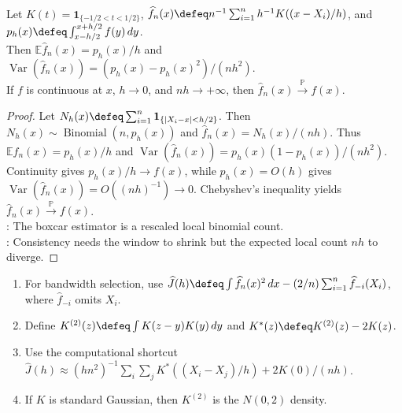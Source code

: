 \begin{proposition} \label{prop:boxcar-kernel-expectation-variance-consistency} \\
Let $K(t)=\mathbf{1}_{\{-1/2<t<1/2\}}$, $\widehat f_n(x)\defeq n^{-1}\sum_{i=1}^{n}h^{-1}K((x-X_i)/h)$, and $p_h(x)\defeq\int_{x-h/2}^{x+h/2}f(y)\,dy$.\\
Then $\mathbb{E}\widehat f_n(x)=p_h(x)/h$ and $\operatorname{Var}(\widehat f_n(x))=(p_h(x)-p_h(x)^2)/(nh^2)$.\\
If $f$ is continuous at $x$, $h\to0$, and $nh\to+\infty$, then $\widehat f_n(x)\xrightarrow{\mathbb{P}}f(x)$.
\begin{proof}
Let $N_h(x)\defeq\sum_{i=1}^{n}\mathbf{1}_{\{|X_i-x|<h/2\}}$.
Then $N_h(x)\sim\operatorname{Binomial}(n,p_h(x))$ and $\widehat f_n(x)=N_h(x)/(nh)$.
Thus $\mathbb{E}\widehat f_n(x)=p_h(x)/h$ and $\operatorname{Var}(\widehat f_n(x))=p_h(x)(1-p_h(x))/(nh^2)$.
Continuity gives $p_h(x)/h\to f(x)$, while $p_h(x)=O(h)$ gives $\operatorname{Var}(\widehat f_n(x))=O((nh)^{-1})\to0$.
Chebyshev's inequality yields $\widehat f_n(x)\xrightarrow{\mathbb{P}}f(x)$.\\
: The boxcar estimator is a rescaled local binomial count.\\
: Consistency needs the window to shrink but the expected local count $nh$ to diverge.
\end{proof}
\end{proposition}

\begin{method} \label{meth:kde-cross-validation} 
\begin{enumerate}[label=(\roman*)]
\setlength{\itemsep}{0pt}
\item For bandwidth selection, use $\widehat J(h)\defeq\int\widehat f_n(x)^2\,dx-(2/n)\sum_{i=1}^{n}\widehat f_{-i}(X_i)$, where $\widehat f_{-i}$ omits $X_i$.
\item Define $K^{(2)}(z)\defeq\int K(z-y)K(y)\,dy$ and $K^*(z)\defeq K^{(2)}(z)-2K(z)$.
\item Use the computational shortcut $\widehat J(h)\approx (hn^2)^{-1}\sum_i\sum_j K^*((X_i-X_j)/h)+2K(0)/(nh)$.
\item If $K$ is standard Gaussian, then $K^{(2)}$ is the $N(0,2)$ density.
\end{enumerate}
\end{method}

